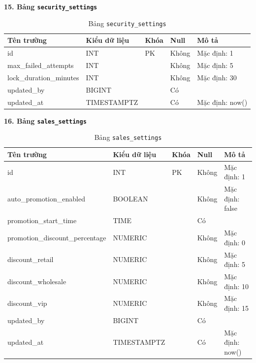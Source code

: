 \documentclass[12pt,a4paper]{report}
\begin{document}
\vspace{0.3cm}
\textbf{15. Bảng \texttt{security\_settings}}
\vspace{0.1cm}
\begin{longtable}{|>{\ttfamily}p{3.5cm}|p{2.5cm}|p{1.5cm}|p{1.5cm}|p{5cm}|}
\caption{Bảng \texttt{security\_settings}} \label{tab:db_security_settings} \\
\hline
\normalfont\textbf{Tên trường} & \textbf{Kiểu dữ liệu} & \textbf{Khóa} & \textbf{Null} & \textbf{Mô tả} \\ \hline
id & INT & PK & Không & Mặc định: 1 \\ \hline
max\_failed\_attempts & INT & & Không & Mặc định: 5 \\ \hline
lock\_duration\_minutes & INT & & Không & Mặc định: 30 \\ \hline
updated\_by & BIGINT & & Có & \\ \hline
updated\_at & TIMESTAMPTZ & & Có & Mặc định: now() \\ \hline
\end{longtable}

\vspace{0.3cm}
\textbf{16. Bảng \texttt{sales\_settings}}
\vspace{0.1cm}
\begin{longtable}{|>{\ttfamily}p{3.5cm}|p{2.5cm}|p{1.5cm}|p{1.5cm}|p{5cm}|}
\caption{Bảng \texttt{sales\_settings}} \label{tab:db_sales_settings} \\
\hline
\normalfont\textbf{Tên trường} & \textbf{Kiểu dữ liệu} & \textbf{Khóa} & \textbf{Null} & \textbf{Mô tả} \\ \hline
id & INT & PK & Không & Mặc định: 1 \\ \hline
auto\_promotion\_enabled & BOOLEAN & & Không & Mặc định: false \\ \hline
promotion\_start\_time & TIME & & Có & \\ \hline
promotion\_discount\_percentage & NUMERIC & & Không & Mặc định: 0 \\ \hline
discount\_retail & NUMERIC & & Không & Mặc định: 5 \\ \hline
discount\_wholesale & NUMERIC & & Không & Mặc định: 10 \\ \hline
discount\_vip & NUMERIC & & Không & Mặc định: 15 \\ \hline
updated\_by & BIGINT & & Có & \\ \hline
updated\_at & TIMESTAMPTZ & & Có & Mặc định: now() \\ \hline
\end{longtable}
\end{document}
